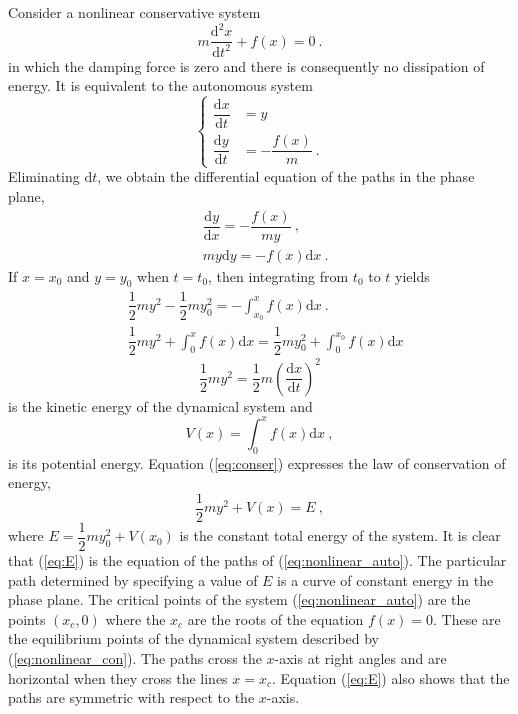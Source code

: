 \documentclass[12pt,a4paper]{article}
\newcommand{\dif}{\mathrm{d}}
\begin{document}
Consider a nonlinear conservative system
\begin{equation}
m \dfrac{\dif^2 x}{\dif t^2} +f(x) = 0 ~.
\label{eq:nonlinear_con}
\end{equation}
in which the damping force is zero and there is consequently no dissipation of energy. It is equivalent to the autonomous system
\begin{equation}
\left\{
\begin{aligned}
\dfrac{\dif x}{\dif t} & =  y \\
\dfrac{\dif y}{\dif t} & =  -\dfrac{f(x)}{m} ~.
\end{aligned}
\right.
\label{eq:nonlinear_auto}
\end{equation}
Eliminating $\dif t$, we obtain the differential equation of the paths in the phase plane,
\begin{align}
& \dfrac{\dif y}{\dif x}  = -\dfrac{f(x)}{my} ~, \\
& my \dif y = -f(x) \dif x ~.
\end{align}
If $x=x_0$ and $y=y_0$ when $t=t_0$, then integrating from $t_0$ to $t$ yields
\begin{align}
& \dfrac{1}{2}my^2 -\dfrac{1}{2}my_0^2 = -\int_{x_0}^x f(x) \dif x ~. \\
& \dfrac{1}{2}my^2 +\int_{0}^x f(x) \dif x = \dfrac{1}{2}my_0^2 +\int_{0}^{x_0} f(x) \dif x
\label{eq:conser}
\end{align}
$$ \dfrac{1}{2}my^2 =  \dfrac{1}{2}m\left(\dfrac{\dif x}{\dif t}\right)^2 $$ is the kinetic energy of the dynamical system and
\begin{equation*}
V(x) = \int_{0}^x f(x) \dif x ~,
\end{equation*}
is its potential energy. Equation (\ref{eq:conser}) expresses the law of conservation of energy,
\begin{equation}
\dfrac{1}{2}my^2 +V(x) = E ~,
\label{eq:E}
\end{equation}
where $E = \dfrac{1}{2}my_0^2 +V(x_0)$ is the constant total energy of the system. It is clear that (\ref{eq:E}) is the equation of the paths of (\ref{eq:nonlinear_auto}). The particular path determined by specifying a value of $E$ is a curve of constant energy in the phase plane. The critical points of the system (\ref{eq:nonlinear_auto}) are the points $(x_c,0)$ where the $x_c$ are the roots of the equation $f(x)=0$. These are the equilibrium points of the dynamical system described by (\ref{eq:nonlinear_con}). The paths cross the $x$-axis at right angles and are horizontal when they cross the lines $x=x_c$. Equation (\ref{eq:E}) also shows that the paths are symmetric with respect to the $x$-axis.
\end{document}
